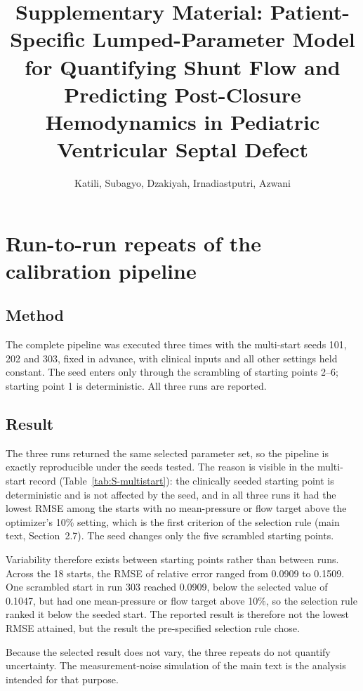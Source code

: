 \documentclass{article}
\title{Supplementary Material: Patient-Specific Lumped-Parameter Model for Quantifying Shunt Flow and Predicting Post-Closure Hemodynamics in Pediatric Ventricular Septal Defect}
\author{Katili, Subagyo, Dzakiyah, Irnadiastputri, Azwani}
\begin{document}
\maketitle


\section{Run-to-run repeats of the calibration pipeline}
\label{sec:S-repeats}

\subsection{Method}
The complete pipeline was executed three times with the multi-start seeds 101, 202 and 303, fixed in advance, with clinical inputs and all other settings held constant. The seed enters only through the scrambling of starting points 2--6; starting point 1 is deterministic. All three runs are reported.

\subsection{Result}
The three runs returned the same selected parameter set, so the pipeline is exactly reproducible under the seeds tested. The reason is visible in the multi-start record (Table~\ref{tab:S-multistart}): the clinically seeded starting point is deterministic and is not affected by the seed, and in all three runs it had the lowest RMSE among the starts with no mean-pressure or flow target above the optimizer's 10\% setting, which is the first criterion of the selection rule (main text, Section~2.7). The seed changes only the five scrambled starting points.

Variability therefore exists between starting points rather than between runs. Across the 18 starts, the RMSE of relative error ranged from 0.0909 to 0.1509. One scrambled start in run 303 reached 0.0909, below the selected value of 0.1047, but had one mean-pressure or flow target above 10\%, so the selection rule ranked it below the seeded start. The reported result is therefore not the lowest RMSE attained, but the result the pre-specified selection rule chose.

Because the selected result does not vary, the three repeats do not quantify uncertainty. The measurement-noise simulation of the main text is the analysis intended for that purpose.
\end{document}
